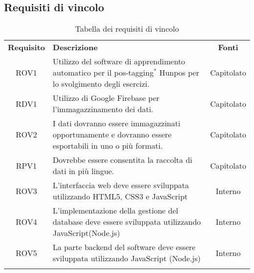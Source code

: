 \subsection{Requisiti di vincolo}
\begin{longtable}{| c | p{10cm} | c |}
		\rowcolor{LightBlue}
		\color{white}\bfseries Requisito & \color{white}\bfseries Descrizione & \color{white}\bfseries Fonti\\[0.25cm]
		ROV1 & Utilizzo del software di apprendimento automatico per il pos-tagging$^*$ Hunpos per lo svolgimento degli esercizi. & Capitolato \\
		RDV1 & Utilizzo di Google Firebase per l'immagazzinamento dei dati. & Capitolato \\
		ROV2 & I dati dovranno essere immagazzinati opportunamente e dovranno essere esportabili in uno o più formati. & Capitolato \\
		RPV1 & Dovrebbe essere consentita la raccolta di dati in più lingue. & Capitolato \\
		ROV3 & L’interfaccia web deve essere sviluppata utilizzando HTML5, CSS3 e JavaScript & Interno\\
		ROV4 & L'implementazione della gestione del database deve essere sviluppata utilizzando JavaScript(Node.js) & Interno\\
		ROV5 & La parte backend del software deve essere sviluppata utilizzando JavaScript (Node.js) & Interno\\
		\hline
		\caption{Tabella dei requisiti di vincolo}
\end{longtable}

